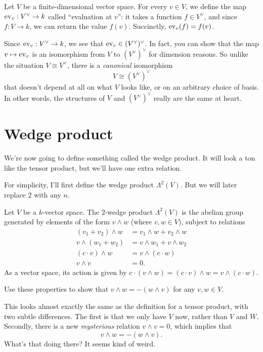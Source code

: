 \begin{itemize}
	Let $V$ be a finite-dimensional vector space.
	For every $v \in V$, we define the map $\operatorname{ev}_v : V^\vee \to k$
	called ``evaluation at $v$'': it takes a function $f \in V^\vee$,
	and since $f : V \to k$, we can return the value $f(v)$.
	Succinctly, $\operatorname{ev}_v(f) = f(v)$.

	Since $\operatorname{ev}_v : V^\vee \to k$, we see that
	$\operatorname{ev}_v \in (V^\vee)^\vee$.
	In fact, you can show that the map $v \mapsto \operatorname{ev}_v$
	is an isomorphism from $V$ to $(V^\vee)^\vee$ for dimension reasons.
	So unlike the situation $V \cong V^\vee$, there
	is a \emph{canonical} isomorphism \[ V \cong (V^\vee)^\vee \]
	that doesn't depend at all on what $V$ looks like,
	or on an arbitrary choice of basis.
	In other words, the structures of $V$ and $(V^\vee)^\vee$
	really are the same at heart.
\end{itemize}



\section{Wedge product}
We're now going to define something called the wedge product.
It will look a ton like the tensor product, but we'll have one extra relation.

For simplicity, I'll first define the wedge product $\Lambda^2(V)$.
But we will later replace $2$ with any $n$.

\begin{definition}
	Let $V$ be a $k$-vector space.
	The $2$-wedge product $\Lambda^2(V)$ is the abelian group
	generated by elements of the form $v \wedge w$ (where $v,w \in V$),
	subject to relations
	\begin{align*}
		(v_1 + v_2) \wedge w &= v_1 \wedge w + v_2 \wedge w \\
		v \wedge (w_1 + w_2) &= v \wedge w_1 + v \wedge w_2 \\
		(c \cdot v) \wedge w &= v \wedge (c \cdot w) \\
		v \wedge v &= 0.
	\end{align*}
	As a vector space, its action is given by
	$c \cdot (v \wedge w) = (c \cdot v) \wedge w = v \wedge (c \cdot w)$.
\end{definition}
\begin{exercise}
	Use these properties to show that $v \wedge w = - (w \wedge v)$
	for any $v,w \in V$.
\end{exercise}

This looks almost exactly the same as the definition for a tensor product,
with two subtle differences.
The first is that we only have $V$ now, rather than $V$ and $W$.
Secondly, there is a new \emph{mysterious} relation $v \wedge v = 0$,
which implies that
\[ v \wedge w = - (w \wedge v). \]
What's that doing there?
It seems kind of weird.

